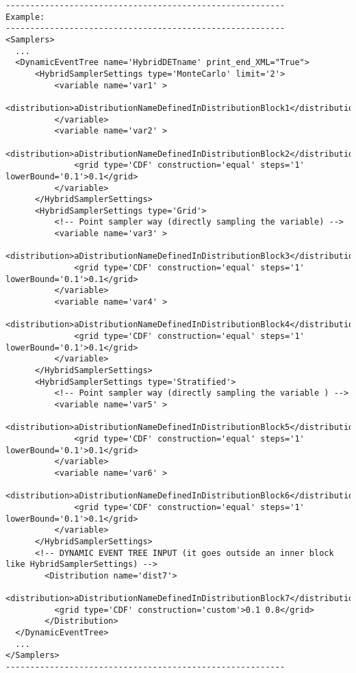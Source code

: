 \begin{lstlisting}[style=XML]
---------------------------------------------------------
Example:
---------------------------------------------------------
<Samplers>
  ...
  <DynamicEventTree name='HybridDETname' print_end_XML="True">
      <HybridSamplerSettings type='MonteCarlo' limit='2'>
          <variable name='var1' >
              <distribution>aDistributionNameDefinedInDistributionBlock1</distribution> 
          </variable>
          <variable name='var2' >
              <distribution>aDistributionNameDefinedInDistributionBlock2</distribution> 
              <grid type='CDF' construction='equal' steps='1' lowerBound='0.1'>0.1</grid>
          </variable>
      </HybridSamplerSettings>
      <HybridSamplerSettings type='Grid'>
          <!-- Point sampler way (directly sampling the variable) -->
          <variable name='var3' >
              <distribution>aDistributionNameDefinedInDistributionBlock3</distribution> 
              <grid type='CDF' construction='equal' steps='1' lowerBound='0.1'>0.1</grid>
          </variable>
          <variable name='var4' >
              <distribution>aDistributionNameDefinedInDistributionBlock4</distribution> 
              <grid type='CDF' construction='equal' steps='1' lowerBound='0.1'>0.1</grid>
          </variable>
      </HybridSamplerSettings>
      <HybridSamplerSettings type='Stratified'>
          <!-- Point sampler way (directly sampling the variable ) -->
          <variable name='var5' >
              <distribution>aDistributionNameDefinedInDistributionBlock5</distribution> 
              <grid type='CDF' construction='equal' steps='1' lowerBound='0.1'>0.1</grid>
          </variable>
          <variable name='var6' >
              <distribution>aDistributionNameDefinedInDistributionBlock6</distribution> 
              <grid type='CDF' construction='equal' steps='1' lowerBound='0.1'>0.1</grid>
          </variable>
      </HybridSamplerSettings>
      <!-- DYNAMIC EVENT TREE INPUT (it goes outside an inner block like HybridSamplerSettings) -->
        <Distribution name='dist7'>
          <distribution>aDistributionNameDefinedInDistributionBlock7</distribution> 
          <grid type='CDF' construction='custom'>0.1 0.8</grid>
        </Distribution>
  </DynamicEventTree>
  ...
</Samplers>
---------------------------------------------------------
\end{lstlisting}

